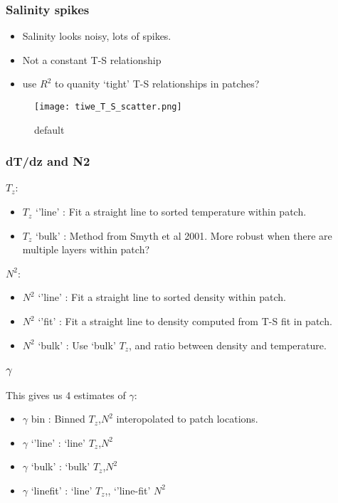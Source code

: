 \documentclass{beamer}
\begin{document}
\begin{frame}
 \frametitle{Salinity spikes}
\begin{itemize}
\item Salinity looks noisy, lots of spikes.
\item Not a constant T-S relationship 
\item use $R^2$ to quanity `tight' T-S relationships in patches?
\end{itemize}


\begin{figure}[htbp]
\begin{center}
\texttt{[image: tiwe\_T\_S\_scatter.png]}
\caption{default}
\label{default}
\end{center}
\end{figure}


\end{frame}




\begin{frame}
 \frametitle{dT/dz and N2}
 
$T_z$:
\begin{itemize}
\item $T_z$ `'line' : Fit a straight line to sorted temperature within patch.
\item $T_z$ `bulk' : Method from Smyth et al 2001. More robust when there are multiple layers within patch?
\end{itemize}

$N^2$:
\begin{itemize}
\item $N^2$ `'line' : Fit a straight line to sorted density within patch.
\item $N^2$ `'fit' : Fit a straight line to density computed from T-S fit in patch.
\item $N^2$ `bulk' : Use `bulk' $T_z$, and ratio between density and temperature.
\end{itemize}


\end{frame}




\begin{frame}
 \frametitle{$\gamma$}

This gives us 4 estimates of $\gamma$: 
\begin{itemize}
\item $\gamma$ bin : Binned $T_z$,$N^2$ interopolated to patch locations.
\item $\gamma$ `'line' : `line' $T_z$,$N^2$
\item $\gamma$ `bulk' : `bulk' $T_z$,$N^2$
\item $\gamma$ `linefit' : `line' $T_z$,, `'line-fit' $N^2$
\end{itemize}

\end{frame}
\end{document}
